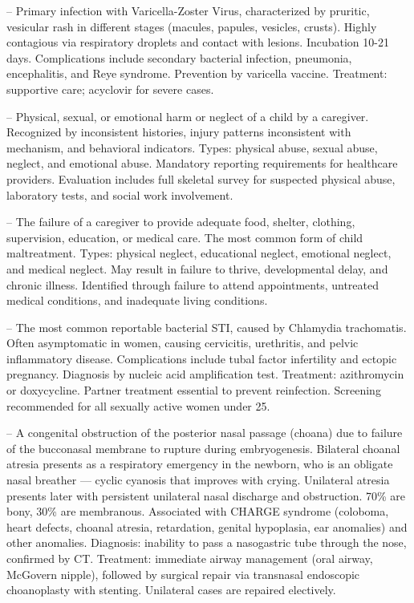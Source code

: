 -- Primary infection with Varicella-Zoster Virus, characterized by pruritic, vesicular rash in different stages (macules, papules, vesicles, crusts). Highly contagious via respiratory droplets and contact with lesions. Incubation 10-21 days. Complications include secondary bacterial infection, pneumonia, encephalitis, and Reye syndrome. Prevention by varicella vaccine. Treatment: supportive care; acyclovir for severe cases.

-- Physical, sexual, or emotional harm or neglect of a child by a caregiver. Recognized by inconsistent histories, injury patterns inconsistent with mechanism, and behavioral indicators. Types: physical abuse, sexual abuse, neglect, and emotional abuse. Mandatory reporting requirements for healthcare providers. Evaluation includes full skeletal survey for suspected physical abuse, laboratory tests, and social work involvement.

-- The failure of a caregiver to provide adequate food, shelter, clothing, supervision, education, or medical care. The most common form of child maltreatment. Types: physical neglect, educational neglect, emotional neglect, and medical neglect. May result in failure to thrive, developmental delay, and chronic illness. Identified through failure to attend appointments, untreated medical conditions, and inadequate living conditions.

-- The most common reportable bacterial STI, caused by Chlamydia trachomatis. Often asymptomatic in women, causing cervicitis, urethritis, and pelvic inflammatory disease. Complications include tubal factor infertility and ectopic pregnancy. Diagnosis by nucleic acid amplification test. Treatment: azithromycin or doxycycline. Partner treatment essential to prevent reinfection. Screening recommended for all sexually active women under 25.

-- A congenital obstruction of the posterior nasal passage (choana) due to failure of the bucconasal membrane to rupture during embryogenesis. Bilateral choanal atresia presents as a respiratory emergency in the newborn, who is an obligate nasal breather — cyclic cyanosis that improves with crying. Unilateral atresia presents later with persistent unilateral nasal discharge and obstruction. 70\% are bony, 30\% are membranous. Associated with CHARGE syndrome (coloboma, heart defects, choanal atresia, retardation, genital hypoplasia, ear anomalies) and other anomalies. Diagnosis: inability to pass a nasogastric tube through the nose, confirmed by CT. Treatment: immediate airway management (oral airway, McGovern nipple), followed by surgical repair via transnasal endoscopic choanoplasty with stenting. Unilateral cases are repaired electively.

